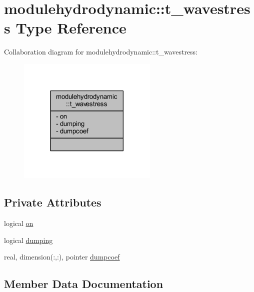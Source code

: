 \hypertarget{structmodulehydrodynamic_1_1t__wavestress}{}\section{modulehydrodynamic\+:\+:t\+\_\+wavestress Type Reference}
\label{structmodulehydrodynamic_1_1t__wavestress}


Collaboration diagram for modulehydrodynamic\+:\+:t\+\_\+wavestress\+:\nopagebreak
\begin{figure}[H]
\begin{center}
\leavevmode
\includegraphics[width=189pt]{structmodulehydrodynamic_1_1t__wavestress__coll__graph}
\end{center}
\end{figure}
\subsection*{Private Attributes}
\begin{DoxyCompactItemize}
\item 
logical \mbox{\hyperlink{structmodulehydrodynamic_1_1t__wavestress_aa28bdb3fe03edd7866af07332d1e8a63}{on}}
\item 
logical \mbox{\hyperlink{structmodulehydrodynamic_1_1t__wavestress_a13ebd6b434db2996a151292e9f24293b}{dumping}}
\item 
real, dimension(\+:,\+:), pointer \mbox{\hyperlink{structmodulehydrodynamic_1_1t__wavestress_a4bdbe1d298ccda7e3559f6c58d04ddce}{dumpcoef}}
\end{DoxyCompactItemize}


\subsection{Member Data Documentation}
\mbox{\label{structmodulehydrodynamic_1_1t__wavestress_a4bdbe1d298ccda7e3559f6c58d04ddce}} 
